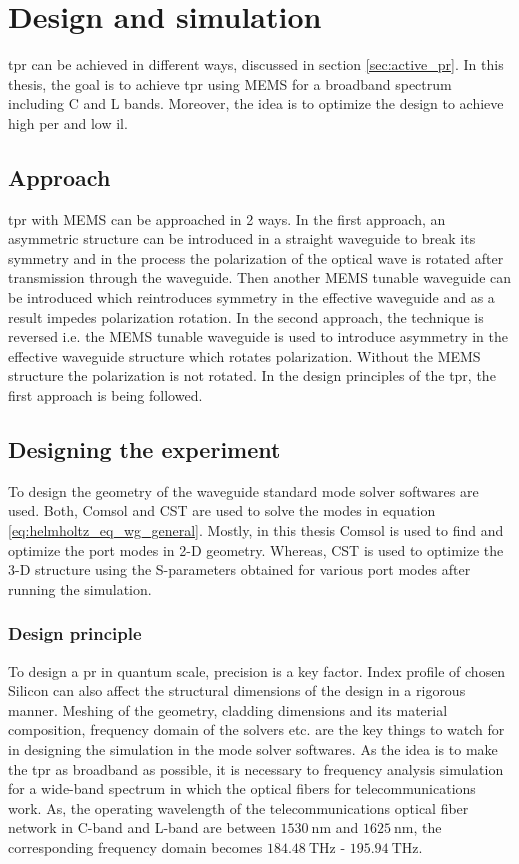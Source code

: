 \documentclass[../report.tex]{subfiles}
\begin{document}
	

\chapter{Design and simulation}
\gls{tpr} can be achieved in different ways, discussed in section \ref*{sec:active_pr}. In this thesis, the goal is to achieve \gls{tpr} using MEMS for a broadband spectrum including C and L bands. Moreover, the idea is to optimize the design to achieve high \gls{per} and low \gls{il}.  
	
	\section{Approach}
	\gls{tpr} with MEMS can be approached in 2 ways. In the first approach, an asymmetric structure can be introduced in a straight waveguide to break its symmetry and in the process the polarization of the optical wave is rotated after transmission through the waveguide. Then another MEMS tunable waveguide can be introduced which reintroduces symmetry in the effective waveguide and as a result impedes polarization rotation. In the second approach, the technique is reversed i.e. the MEMS tunable waveguide is used to introduce asymmetry in the effective waveguide structure which rotates polarization. Without the MEMS structure the polarization is not rotated. In the design principles of the \gls{tpr}, the first approach is being followed.  
	
	\section{Designing the experiment}
	To design the geometry of the waveguide standard mode solver softwares are used. Both, Comsol\cite{comsol_2015} and CST \cite{cst_2015} are used to solve the modes in equation \ref{eq:helmholtz_eq_wg_general}. Mostly, in this thesis Comsol is used to find and optimize the port modes in 2-D geometry. Whereas, CST is used to optimize the 3-D structure using the S-parameters obtained for various port modes after running the simulation. 
		
		\subsection{Design principle}
To design a \gls{pr} in quantum scale, precision is a key factor. Index profile of chosen Silicon can also affect the structural dimensions of the design in a rigorous manner. Meshing of the geometry, cladding dimensions and its material composition, frequency domain of the solvers etc. are the key things to watch for in designing the simulation in the mode solver softwares. As the idea is to make the \gls{tpr} as broadband as possible, it is necessary to frequency analysis simulation for a wide-band spectrum in which the optical fibers for telecommunications work. As, the operating wavelength of the telecommunications optical fiber network in C-band and L-band are between $\SI{1530}{\nano\metre}$ and $\SI{1625}{\nano\metre}$, the corresponding frequency domain becomes $\SI{184.48}{\THz}$ - $\SI{195.94}{\THz}$.
\end{document}
